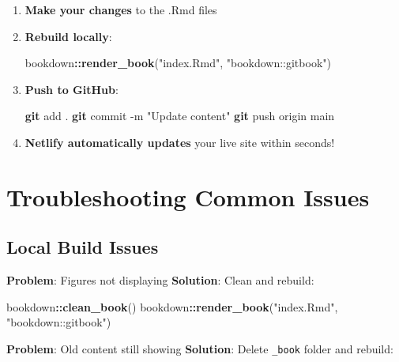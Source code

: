 \documentclass[
]{book}
\newenvironment{Shaded}{\begin{snugshade}}{\end{snugshade}}
\newcommand{\AttributeTok}[1]{\textcolor[rgb]{0.13,0.29,0.53}{#1}}
\newcommand{\FunctionTok}[1]{\textcolor[rgb]{0.13,0.29,0.53}{\textbf{#1}}}
\newcommand{\NormalTok}[1]{#1}
\newcommand{\SpecialCharTok}[1]{\textcolor[rgb]{0.81,0.36,0.00}{\textbf{#1}}}
\newcommand{\StringTok}[1]{\textcolor[rgb]{0.31,0.60,0.02}{#1}}
\begin{document}
\begin{enumerate}
\def\labelenumi{\arabic{enumi}.}
\item
  \textbf{Make your changes} to the .Rmd files
\item
  \textbf{Rebuild locally}:

\begin{Shaded}
\begin{Highlighting}[]
\NormalTok{bookdown}\SpecialCharTok{::}\FunctionTok{render\_book}\NormalTok{(}\StringTok{"index.Rmd"}\NormalTok{, }\StringTok{"bookdown::gitbook"}\NormalTok{)}
\end{Highlighting}
\end{Shaded}
\item
  \textbf{Push to GitHub}:

\begin{Shaded}
\begin{Highlighting}[]
\FunctionTok{git}\NormalTok{ add .}
\FunctionTok{git}\NormalTok{ commit }\AttributeTok{{-}m} \StringTok{"Update content"}
\FunctionTok{git}\NormalTok{ push origin main}
\end{Highlighting}
\end{Shaded}
\item
  \textbf{Netlify automatically updates} your live site within seconds!
\end{enumerate}

\section{Troubleshooting Common Issues}\label{troubleshooting-common-issues}

\subsection{Local Build Issues}\label{local-build-issues}

\textbf{Problem}: Figures not displaying
\textbf{Solution}: Clean and rebuild:

\begin{Shaded}
\begin{Highlighting}[]
\NormalTok{bookdown}\SpecialCharTok{::}\FunctionTok{clean\_book}\NormalTok{()}
\NormalTok{bookdown}\SpecialCharTok{::}\FunctionTok{render\_book}\NormalTok{(}\StringTok{"index.Rmd"}\NormalTok{, }\StringTok{"bookdown::gitbook"}\NormalTok{)}
\end{Highlighting}
\end{Shaded}

\textbf{Problem}: Old content still showing
\textbf{Solution}: Delete \texttt{\_book} folder and rebuild:
\end{document}
